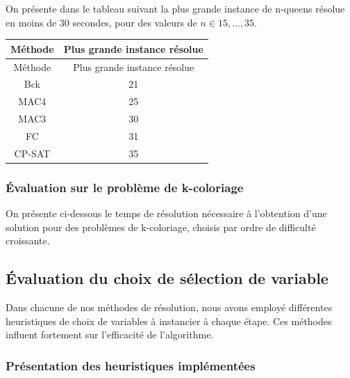 \documentclass[14pt]{article}
\begin{document}
On présente dans le tableau suivant la plus grande instance de n-queens résolue en moins de 30 secondes, pour des valeurs de $n \in {15,\dots,35}$.

\begin{longtable}{|c|c|}
    \hline
    Méthode & Plus grande instance résolue \\
    \hline
    \endfirsthead

    Méthode & Plus grande instance résolue \\
    \hline
    \endhead

    \hline
    \endfoot

    \hline
    \endlastfoot

    Bck     & 21                           \\
    MAC4    & 25                           \\
    MAC3    & 30                           \\
    FC      & 31                           \\
    CP-SAT  & 35                           \\
\end{longtable}


\subsubsection{Évaluation sur le problème de k-coloriage}

On présente ci-dessous le temps de résolution nécessaire à l'obtention d'une solution pour des problèmes de k-coloriage, choisis par ordre de difficulté croissante.

\subsection{Évaluation du choix de sélection de variable}

Dans chacune de nos méthodes de résolution, nous avons employé différentes heuristiques de choix de variables à instancier à chaque étape. Ces méthodes influent fortement sur l'efficacité de l'algorithme.

\subsubsection{Présentation des heuristiques implémentées}
\end{document}
